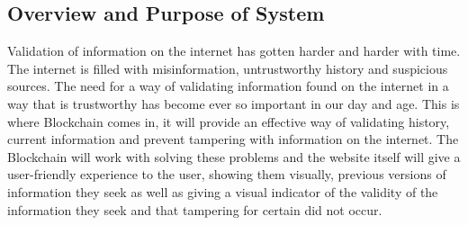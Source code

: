\subsection{Overview and Purpose of System}

Validation of information on the internet has gotten harder and harder with time.\\

The internet is filled with misinformation, untrustworthy history and suspicious sources. 
The need for a way of validating information found on the internet in a way that is 
trustworthy has become ever so important in our day and age.
This is where Blockchain comes in, it will provide an effective way of validating
history, current information and prevent tampering with information on the internet.
The Blockchain will work with solving these problems and the website itself will give a 
user-friendly experience to the user, showing them visually, previous versions of information 
they seek as well as giving a visual indicator of the validity  of the information they seek 
and that tampering for certain did not occur.
